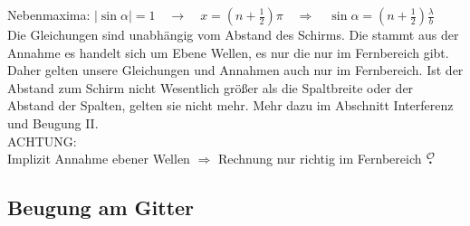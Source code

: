 \documentclass[titlepage,11pt,a4paper,ngerman]{report}
\newcommand{\lcom}[1]{\color{MidnightBlue}#1\color{black}}
\newcommand{\mau}{$\buildrel \mathcal{O} \over{\textbf{.}}$}
\begin{document}
Nebenmaxima: $ |\sin \alpha| = 1 \quad \rightarrow \quad x = \left(n + \frac{1}{2}\right) \pi \quad \Rightarrow \quad  \sin \alpha = \left(n + \frac{1}{2}\right) \frac{\lambda}{b} $\\[5pt]
\lcom{Die Gleichungen sind unabhängig vom Abstand des Schirms. Die stammt aus der Annahme es handelt sich um Ebene Wellen, es nur die nur im Fernbereich gibt. Daher gelten unsere Gleichungen und Annahmen auch nur im Fernbereich. Ist der Abstand zum Schirm nicht Wesentlich größer als die Spaltbreite oder der Abstand der Spalten, gelten sie nicht mehr. Mehr dazu im Abschnitt Interferenz und Beugung II.}\\[5pt]
ACHTUNG:\\
Implizit Annahme ebener Wellen $ \Rightarrow $ Rechnung nur richtig im Fernbereich \mau

\subsection{Beugung am Gitter}
\end{document}
